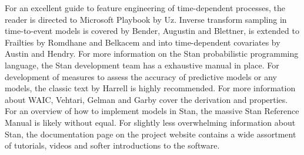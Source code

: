 For an excellent guide to feature engineering of time-dependent processes, the reader is directed to Microsoft Playbook by Uz\cite{Uz2016}. Inverse transform sampling in time-to-event models is covered by Bender, Augustin and Blettner\cite{Bender2005}, is extended to Frailties by Romdhane and Belkacem\cite{Romdhane2015} and into time-dependent covariates by Austin\cite{Austin2012} and Hendry\cite{Hendry2014}. For more information on the Stan probabilistic programming language, the Stan development team has a exhaustive manual in place\cite{StanDevelopmentTeam2016}. For development of measures to assess the accuracy of predictive models or any models, the classic text by Harrell is highly recommended\cite{Harrell2001}. For more information about WAIC, Vehtari, Gelman and Garby cover the derivation and properties\cite{Vehtari2015}. For an overview of how to implement models in Stan, the massive Stan Reference Manual is likely without equal\cite{StanDevelopmentTeam2016}. For slightly less overwhelming information about Stan, the documentation page on the project website contains a wide assortment of tutorials, videos and softer introductions to the software\cite{StanDevelopmentTeam2016a}.


